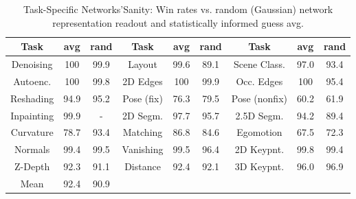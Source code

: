 \documentclass[10pt,twocolumn,letterpaper]{article}
\begin{document}
\begin{table*}
	\caption{Task-Specific Networks'Sanity: Win rates vs. random (Gaussian) network representation readout and statistically informed guess avg.}\label{t1}
	\begin{center}
		\begin{tabular}{|c|c c|c|c c|c|c c|}
			\hline
			Task & avg & rand& Task& avg & rand& Task& avg& rand \\
			\hline\hline
			Denoising & 100& 99.9& Layout& 99.6& 89.1& Scene Class.& 97.0 & 93.4 \\

			Autoenc. & 100& 99.8& 2D Edges& 100& 99.9& Occ. Edges& 100& 95.4 \\

			Reshading & 94.9& 95.2&Pose (fix)& 76.3& 79.5& Pose (nonfix)& 60.2& 61.9 \\

			Inpainting & 99.9& -& 2D Segm.& 97.7& 95.7&2.5D Segm.&94.2& 89.4 \\

		    Curvature & 78.7&93.4& Matching& 86.8& 84.6&Egomotion&67.5&72.3 \\

			Normals & 99.4& 99.5&Vanishing&99.5&96.4&2D Keypnt.&99.8& 99.4 \\

			Z-Depth & 92.3& 91.1& Distance& 92.4& 92.1& 3D Keypnt.&96.0&96.9 \\
			\hline
			Mean & 92.4& 90.9& \multicolumn{6}{c|}{ } \\
			\hline
		\end{tabular}
	\end{center}
\end{table*}

{\small


}
\end{document}
